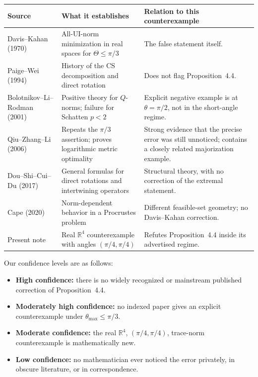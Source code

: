 \documentclass[11pt]{article}
\newcommand{\R}{\mathbb R}
\begin{document}
\begin{center}
\begin{tabularx}{0.97\textwidth}{>{\raggedright\arraybackslash}p{}
                                  >{\raggedright\arraybackslash}p{}
                                  >{\raggedright\arraybackslash}X}
\toprule
\textbf{Source} & \textbf{What it establishes} & \textbf{Relation to this counterexample}\\
\midrule
Davis--Kahan (1970) & All-UI-norm minimization in real spaces for $\Theta\leq\pi/3$ & The false statement itself.\\
Paige--Wei (1994) & History of the CS decomposition and direct rotation & Does not flag Proposition~4.4.\\
Bolotnikov--Li--Rodman (2001) & Positive theory for $Q$-norms; failure for Schatten $p<2$ & Explicit negative example is at $\theta=\pi/2$, not in the short-angle regime.\\
Qiu--Zhang--Li (2006) & Repeats the $\pi/3$ assertion; proves logarithmic metric optimality & Strong evidence that the precise error was still unnoticed; contains a closely related majorization example.\\
Dou--Shi--Cui--Du (2017) & General formulas for direct rotations and intertwining operators & Structural theory, with no correction of the extremal statement.\\
Cape (2020) & Norm-dependent behavior in a Procrustes problem & Different feasible-set geometry; no Davis--Kahan correction.\\
Present note & Real $\R^4$ counterexample with angles $(\pi/4,\pi/4)$ & Refutes Proposition~4.4 inside its advertised regime.\\
\bottomrule
\end{tabularx}
\end{center}

Our confidence levels are as follows:
\begin{itemize}
\item \textbf{High confidence:} there is no widely recognized or mainstream
  published correction of Proposition~4.4.
\item \textbf{Moderately high confidence:} no indexed paper gives an explicit
  counterexample under $\theta_{\max}\leq\pi/3$.
\item \textbf{Moderate confidence:} the real $\R^4$, $(\pi/4,\pi/4)$,
  trace-norm counterexample is mathematically new.
\item \textbf{Low confidence:} no mathematician ever noticed the error
  privately, in obscure literature, or in correspondence.
\end{itemize}
\end{document}
